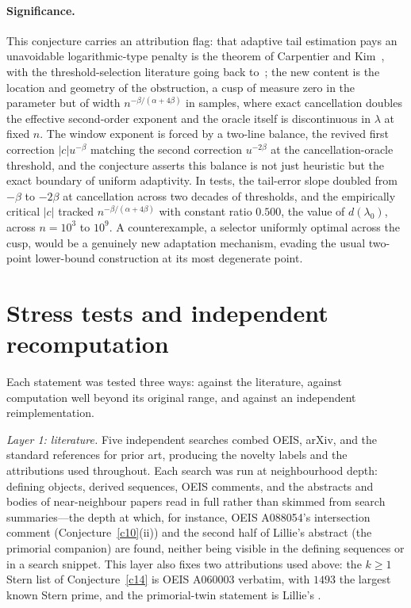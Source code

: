 \documentclass[11pt]{article}
\theoremstyle{definition}
\begin{document}
\paragraph{Significance.}
This conjecture carries an attribution flag: that adaptive tail estimation pays an unavoidable logarithmic-type penalty is the theorem of Carpentier and Kim~\cite{CK15}, with the threshold-selection literature going back to~\cite{Hall82,DK98,Pic75}; the new content is the location and geometry of the obstruction, a cusp of measure zero in the parameter but of width $n^{-\beta/(\alpha+4\beta)}$ in samples, where exact cancellation doubles the effective second-order exponent and the oracle itself is discontinuous in $\lambda$ at fixed $n$.  The window exponent is forced by a two-line balance, the revived first correction $|c|u^{-\beta}$ matching the second correction $u^{-2\beta}$ at the cancellation-oracle threshold, and the conjecture asserts this balance is not just heuristic but the exact boundary of uniform adaptivity.  In tests, the tail-error slope doubled from $-\beta$ to $-2\beta$ at cancellation across two decades of thresholds, and the empirically critical $|c|$ tracked $n^{-\beta/(\alpha+4\beta)}$ with constant ratio $0.500$, the value of $d(\lambda_0)$, across $n=10^3$ to $10^9$.  A counterexample, a selector uniformly optimal across the cusp, would be a genuinely new adaptation mechanism, evading the usual two-point lower-bound construction at its most degenerate point.

\section{Stress tests and independent recomputation}\label{sec:stress}

Each statement was tested three ways: against the literature, against
computation well beyond its original range, and against an independent
reimplementation.

\emph{Layer 1: literature.}  Five independent searches combed OEIS,
arXiv, and the standard references for prior art, producing the novelty
labels and the attributions used throughout.  Each search
was run at neighbourhood depth: defining objects, derived sequences,
OEIS comments, and the abstracts and bodies of near-neighbour papers
read in full rather than skimmed from search summaries---the depth at
which, for instance, OEIS A088054's intersection comment
(Conjecture~\ref{c10}(ii)) and the second half of Lillie's abstract
(the primorial companion) are found, neither being visible in the
defining sequences or in a search snippet.  This layer also fixes two
attributions used above: the $k\ge1$ Stern list of
Conjecture~\ref{c14} is OEIS A060003 verbatim, with $1493$ the largest
known Stern prime, and the primorial-twin statement is Lillie's
\cite{Lillie}.
\end{document}
